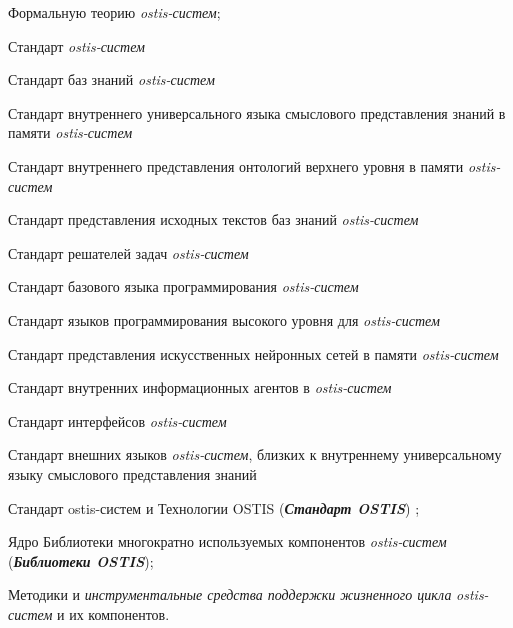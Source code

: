 \begin{textitemize}
	\item Формальную теорию \textit{ostis-систем};
	\item Стандарт \textit{ostis-систем}
	\begin{textitemize}  
		\item Стандарт баз знаний \textit{ostis-систем}
		\begin{textitemize}  
			\item Стандарт внутреннего универсального языка смыслового представления знаний в памяти \textit{ostis-систем}
			\item Стандарт внутреннего представления онтологий верхнего уровня в памяти \textit{ostis-систем}
			\item Стандарт представления исходных текстов баз знаний \textit{ostis-систем}
		\end{textitemize}  
		
		\item Стандарт решателей задач \textit{ostis-систем}
		\begin{textitemize}  
			\item Стандарт базового языка программирования \textit{ostis-систем}
			\item Стандарт языков программирования высокого уровня для \textit{ostis-систем}
			\item Стандарт представления искусственных нейронных сетей в памяти \textit{ostis-систем}
			\item Стандарт внутренних информационных агентов в \textit{ostis-систем}
		\end{textitemize}  
		
		\item Стандарт интерфейсов \textit{ostis-систем}
		\begin{textitemize}  
			\item Стандарт внешних языков \textit{ostis-систем}, близких к внутреннему универсальному языку смыслового представления знаний
		\end{textitemize}  
	\end{textitemize}
	\item Стандарт ostis-систем и Технологии OSTIS (\textbf{\textit{Стандарт OSTIS}}) \cite{Standart2021};
	\item Ядро Библиотеки многократно используемых компонентов \textit{ostis-систем} (\textbf{\textit{Библиотеки OSTIS}});
	\item Методики и \textit{инструментальные средства поддержки жизненного цикла} \textit{ostis-систем} и их компонентов.
\end{textitemize}

